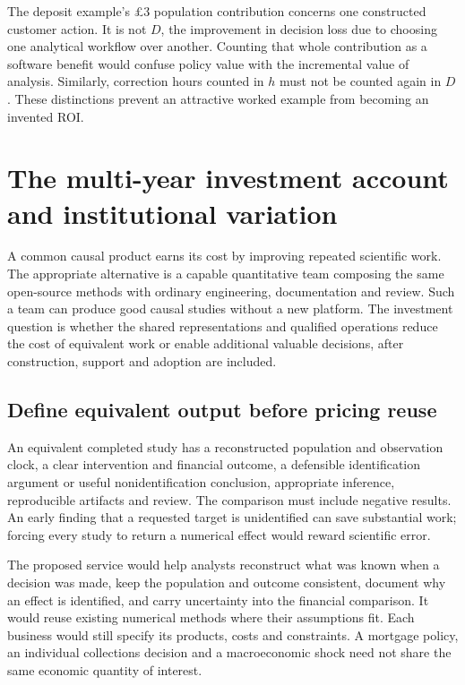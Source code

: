 The deposit example's \pounds3 population contribution concerns one
constructed customer action. It is not $D$, the improvement in decision
loss due to choosing one analytical workflow over another. Counting
that whole contribution as a software benefit would confuse policy value
with the incremental value of analysis. Similarly, correction hours
counted in $h$ must not be counted again in $D$. These distinctions
prevent an attractive worked example from becoming an invented ROI.



\section{The multi-year investment account and institutional variation}
\label{r3:investment}

A common causal product earns its cost by improving repeated scientific
work. The appropriate alternative is a capable quantitative team composing
the same open-source methods with ordinary engineering, documentation and
review. Such a team can produce good causal studies without a new platform.
The investment question is whether the shared representations and qualified
operations reduce the cost of equivalent work or enable additional valuable
decisions, after construction, support and adoption are included.

\subsection{Define equivalent output before pricing reuse}
\label{r3:equivalent-output}

An equivalent completed study has a reconstructed population and observation
clock, a clear intervention and financial outcome, a defensible identification
argument or useful nonidentification conclusion, appropriate inference,
reproducible artifacts and review. The comparison must include negative
results. An early finding that a requested target is unidentified can save
substantial work; forcing every study to return a numerical effect would
reward scientific error.

The proposed service would help analysts reconstruct what was known when
a decision was made, keep the population and outcome consistent, document
why an effect is identified, and carry uncertainty into the financial
comparison. It would reuse existing numerical methods where their
assumptions fit. Each business would still specify its products, costs and
constraints. A mortgage policy, an individual collections decision and a
macroeconomic shock need not share the same economic quantity of interest.

